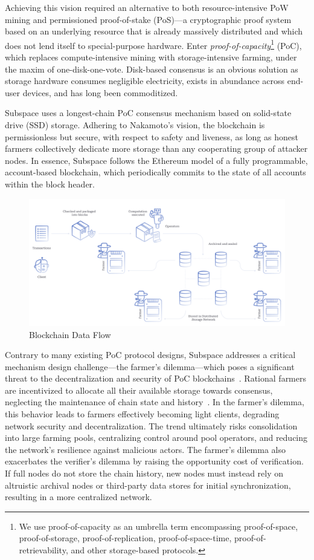 \documentclass[conference]{IEEEtran}
\begin{document}
Achieving this vision required an alternative to both resource-intensive PoW mining and permissioned proof-of-stake (PoS)—a cryptographic proof system based on an underlying resource that is already massively distributed and which does not lend itself to special-purpose hardware. Enter \textit{proof-of-capacity}\footnote{We use proof-of-capacity as an umbrella term encompassing proof-of-space, proof-of-storage, proof-of-replication, proof-of-space-time, proof-of-retrievability, and other storage-based protocols.} (PoC), which replaces compute-intensive mining with storage-intensive farming, under the maxim of one-disk-one-vote. Disk-based consensus is an obvious solution as storage hardware consumes negligible electricity, exists in abundance across end-user devices, and has long been commoditized.

Subspace uses a longest-chain PoC consensus mechanism based on solid-state drive (SSD) storage. Adhering to Nakamoto’s vision, the blockchain is permissionless but secure, with respect to safety and liveness, as long as honest farmers collectively dedicate more storage than any cooperating group of attacker nodes. In essence, Subspace follows the Ethereum model of a fully programmable, account-based blockchain, which periodically commits to the state of all accounts within the block header.

\begin{figure}
    \centering
    \includegraphics[width=0.75\linewidth]{data-flow.png}
\caption{Blockchain Data Flow}
\label{fig:dataflow}
\end{figure}

Contrary to many existing PoC protocol designs, Subspace addresses a critical mechanism design challenge—the farmer's dilemma—which poses a significant threat to the decentralization and security of PoC blockchains~\cite{subspacev1}. Rational farmers are incentivized to allocate all their available storage towards consensus, neglecting the maintenance of chain state and history~\cite{lerner2015}. In the farmer's dilemma, this behavior leads to farmers effectively becoming light clients, degrading network security and decentralization. The trend ultimately risks consolidation into large farming pools, centralizing control around pool operators, and reducing the network's resilience against malicious actors. The farmer's dilemma also exacerbates the verifier's dilemma\cite{luu2015} by raising the opportunity cost of verification. If full nodes do not store the chain history, new nodes must instead rely on altruistic archival nodes or third-party data stores for initial synchronization, resulting in a more centralized network.
\end{document}
